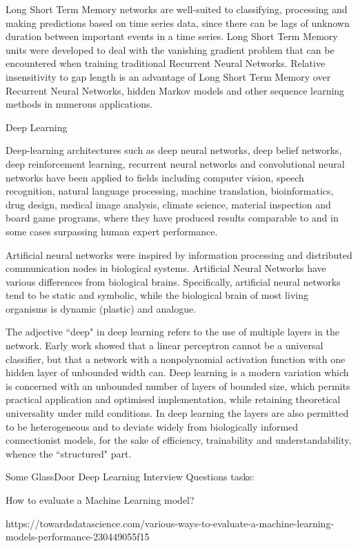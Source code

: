 Long Short Term Memory networks are well-suited to classifying, processing and making predictions based on time series data, since there can be lags of unknown duration between important events in a time series. Long Short Term Memory units were developed to deal with the vanishing gradient problem that can be encountered when training traditional Recurrent Neural Networks. Relative insensitivity to gap length is an advantage of Long Short Term Memory over Recurrent Neural Networks, hidden Markov models and other sequence learning methods in numerous applications.

Deep Learning

Deep-learning architectures such as deep neural networks, deep belief networks, deep reinforcement learning, recurrent neural networks and convolutional neural networks have been applied to fields including computer vision, speech recognition, natural language processing, machine translation, bioinformatics, drug design, medical image analysis, climate science, material inspection and board game programs, where they have produced results comparable to and in some cases surpassing human expert performance.

Artificial neural networks were inspired by information processing and distributed communication nodes in biological systems. Artificial Neural Networks have various differences from biological brains. Specifically, artificial neural networks tend to be static and symbolic, while the biological brain of most living organisms is dynamic (plastic) and analogue.

The adjective ``deep" in deep learning refers to the use of multiple layers in the network. Early work showed that a linear perceptron cannot be a universal classifier, but that a network with a nonpolynomial activation function with one hidden layer of unbounded width can. Deep learning is a modern variation which is concerned with an unbounded number of layers of bounded size, which permits practical application and optimised implementation, while retaining theoretical universality under mild conditions. In deep learning the layers are also permitted to be heterogeneous and to deviate widely from biologically informed connectionist models, for the sake of efficiency, trainability and understandability, whence the ``structured" part.

Some GlassDoor Deep Learning Interview Questions tasks:

How to evaluate a Machine Learning model?

https://towardsdatascience.com/various-ways-to-evaluate-a-machine-learning-models-performance-230449055f15

